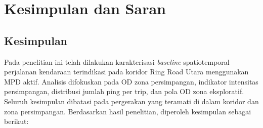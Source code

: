 \chapter{Kesimpulan dan Saran}

\section{Kesimpulan}

Pada penelitian ini telah dilakukan karakterisasi \textit{baseline} spatiotemporal perjalanan kendaraan terindikasi pada koridor Ring Road Utara menggunakan MPD aktif. Analisis difokuskan pada OD zona persimpangan, indikator intensitas persimpangan, distribusi jumlah ping per trip, dan pola OD zona eksploratif. Seluruh kesimpulan dibatasi pada pergerakan yang teramati di dalam koridor dan zona persimpangan. Berdasarkan hasil penelitian, diperoleh kesimpulan sebagai berikut:

